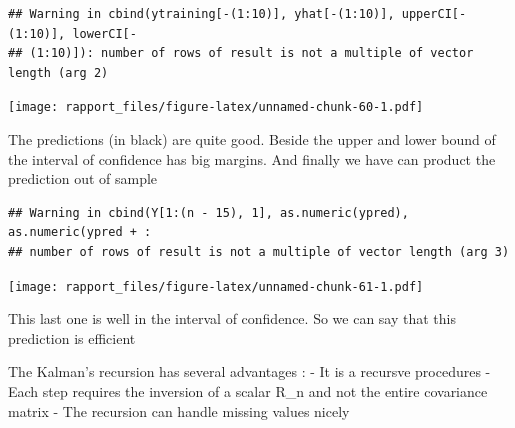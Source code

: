 \documentclass[]{article}
\newenvironment{Shaded}{\begin{snugshade}}{\end{snugshade}}
\newcommand{\KeywordTok}[1]{\textcolor[rgb]{0.13,0.29,0.53}{\textbf{#1}}}
\newcommand{\DataTypeTok}[1]{\textcolor[rgb]{0.13,0.29,0.53}{#1}}
\newcommand{\DecValTok}[1]{\textcolor[rgb]{0.00,0.00,0.81}{#1}}
\newcommand{\CommentTok}[1]{\textcolor[rgb]{0.56,0.35,0.01}{\textit{#1}}}
\newcommand{\OperatorTok}[1]{\textcolor[rgb]{0.81,0.36,0.00}{\textbf{#1}}}
\newcommand{\NormalTok}[1]{#1}
\begin{document}
\begin{verbatim}
## Warning in cbind(ytraining[-(1:10)], yhat[-(1:10)], upperCI[-(1:10)], lowerCI[-
## (1:10)]): number of rows of result is not a multiple of vector length (arg 2)
\end{verbatim}

\texttt{[image: rapport\_files/figure-latex/unnamed-chunk-60-1.pdf]}

The predictions (in black) are quite good. Beside the upper and lower
bound of the interval of confidence has big margins. And finally we have
can product the prediction out of sample

\begin{Shaded}
\end{Shaded}

\begin{verbatim}
## Warning in cbind(Y[1:(n - 15), 1], as.numeric(ypred), as.numeric(ypred + :
## number of rows of result is not a multiple of vector length (arg 3)
\end{verbatim}

\texttt{[image: rapport\_files/figure-latex/unnamed-chunk-61-1.pdf]}

This last one is well in the interval of confidence. So we can say that
this prediction is efficient

The Kalman's recursion has several advantages : - It is a recursve
procedures - Each step requires the inversion of a scalar R\_n and not
the entire covariance matrix - The recursion can handle missing values
nicely
\end{document}
